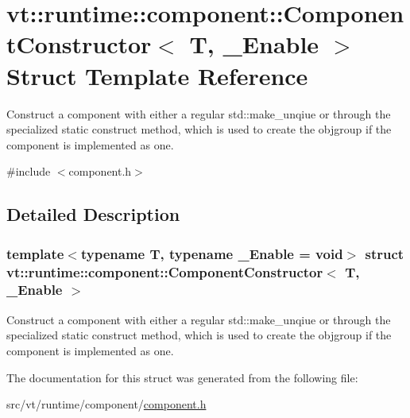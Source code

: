 \hypertarget{structvt_1_1runtime_1_1component_1_1_component_constructor}{}\section{vt\+:\+:runtime\+:\+:component\+:\+:Component\+Constructor$<$ T, \+\_\+\+Enable $>$ Struct Template Reference}
\label{structvt_1_1runtime_1_1component_1_1_component_constructor}


Construct a component with either a regular {\ttfamily std\+::make\+\_\+unqiue} or through the specialized static {\ttfamily construct} method, which is used to create the objgroup if the component is implemented as one.  




{\ttfamily \#include $<$component.\+h$>$}



\subsection{Detailed Description}
\subsubsection*{template$<$typename T, typename \+\_\+\+Enable = void$>$\newline
struct vt\+::runtime\+::component\+::\+Component\+Constructor$<$ T, \+\_\+\+Enable $>$}

Construct a component with either a regular {\ttfamily std\+::make\+\_\+unqiue} or through the specialized static {\ttfamily construct} method, which is used to create the objgroup if the component is implemented as one. 

The documentation for this struct was generated from the following file\+:\begin{DoxyCompactItemize}
\item 
src/vt/runtime/component/\hyperlink{component_8h}{component.\+h}\end{DoxyCompactItemize}
